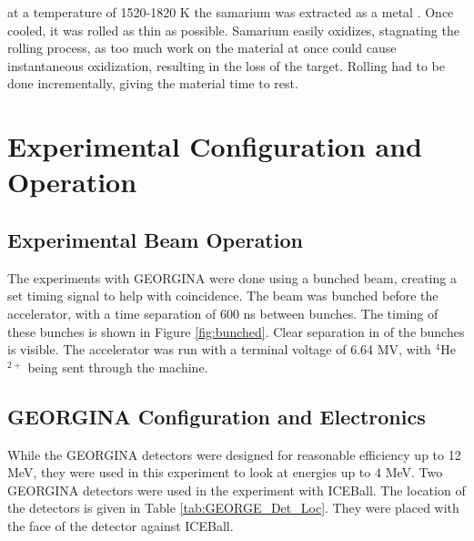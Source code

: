 at a temperature of 1520-1820 K the samarium was extracted as a metal \citep{clifford02:_target}. Once cooled, it was rolled as thin as possible. Samarium easily oxidizes, stagnating the rolling process, as too much work on the material at once could cause instantaneous oxidization, resulting in the loss of the target. Rolling had to be done incrementally, giving the material time to rest.



\section{Experimental Configuration and Operation}

\subsection{Experimental Beam Operation}

The experiments with GEORGINA were done using a bunched beam, creating a set timing signal to help with coincidence. The beam was bunched before the accelerator, with a time separation of 600 ns between bunches. The timing of these bunches is shown in Figure \ref{fig:bunched}. Clear separation in of the bunches is visible. The accelerator was run with a terminal voltage of 6.64 MV, with $^{4}$He$^{2+}$ being sent through the machine. 



\subsection{GEORGINA Configuration and Electronics}
\label{sec:GEORGINA_electronics}

While the GEORGINA detectors were designed for reasonable efficiency up to 12 MeV, they were used in this experiment to look at energies up to 4 MeV. Two GEORGINA detectors were used in the experiment with ICEBall. The location of the detectors is given in Table \ref{tab:GEORGE_Det_Loc}. They were placed with the face of the detector against ICEBall.



